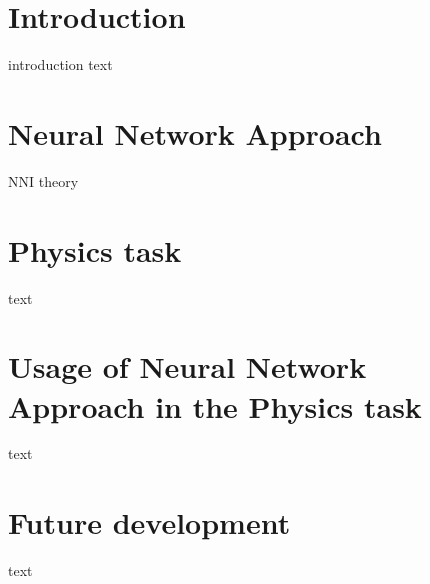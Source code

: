 \documentclass[%
]{ittmm}
\begin{document}
\maketitle

\section{Introduction}

introduction text \cite{lloyd2020using}

\section{Neural Network Approach}

NNI theory \cite{costa2003pseudoscalar} \cite{blaschke2012meson}

\section{Physics task}

text

\section{Usage of Neural Network Approach in the Physics task}

text

\section{Future development}

text



\end{document}
